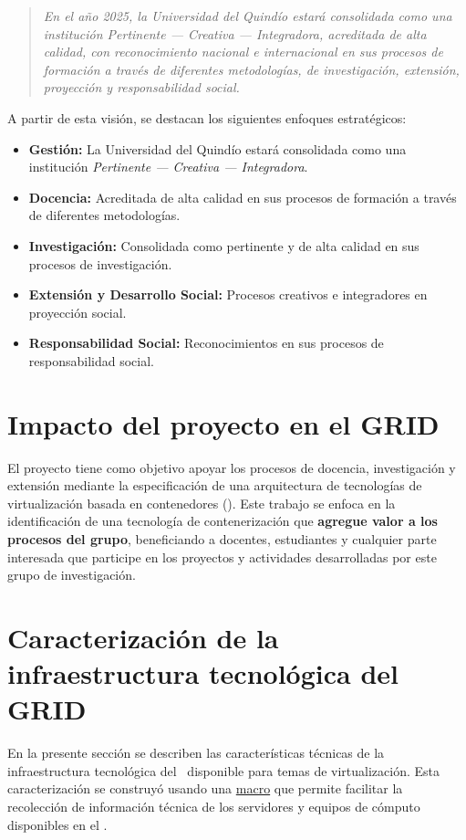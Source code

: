 \begin{quote}
\textit{En el año 2025, la Universidad del Quindío estará consolidada como una institución \textit{Pertinente --- Creativa --- Integradora}, acreditada de alta calidad, con reconocimiento nacional e internacional en sus procesos de formación a través de diferentes metodologías, de investigación, extensión, proyección y responsabilidad social.}
\end{quote}

A partir de esta visión, se destacan los siguientes enfoques estratégicos:

\begin{itemize}
    \item \textbf{Gestión:} La Universidad del Quindío estará consolidada como una institución \textit{Pertinente --- Creativa --- Integradora}.

    \item \textbf{Docencia:} Acreditada de alta calidad en sus procesos de formación a través de diferentes metodologías.

    \item \textbf{Investigación:} Consolidada como pertinente y de alta calidad en sus procesos de investigación.

    \item \textbf{Extensión y Desarrollo Social:} Procesos creativos e integradores en proyección social.

    \item \textbf{Responsabilidad Social:} Reconocimientos en sus procesos de responsabilidad social.
\end{itemize}

\section{Impacto del proyecto en el GRID}
\noindent
El proyecto tiene como objetivo apoyar los procesos de docencia, investigación
y extensión mediante la especificación de una arquitectura de tecnologías de 
virtualización basada en contenedores (\VBC). 
Este trabajo se enfoca en la identificación de una tecnología de contenerización que \textbf{agregue valor a los procesos del grupo}, beneficiando a docentes, estudiantes y cualquier parte interesada que participe en los proyectos y actividades desarrolladas por este grupo de investigación.

\section{Caracterización de la infraestructura tecnológica del GRID}\label{sec:caracterizacion-infraestructura}
\noindent
En la presente sección se describen las características técnicas de la infraestructura tecnológica del \GRID\ disponible para temas de virtualización. Esta caracterización se construyó usando una \href{https://docs.google.com/spreadsheets/d/14NBv72ucVTrLqGIldYdIsjdBGt3QlgwcblcVRis-DaQ/edit?usp=sharing}{macro} que permite facilitar la recolección de información técnica de los servidores y equipos de cómputo disponibles en el \GRID.\\

